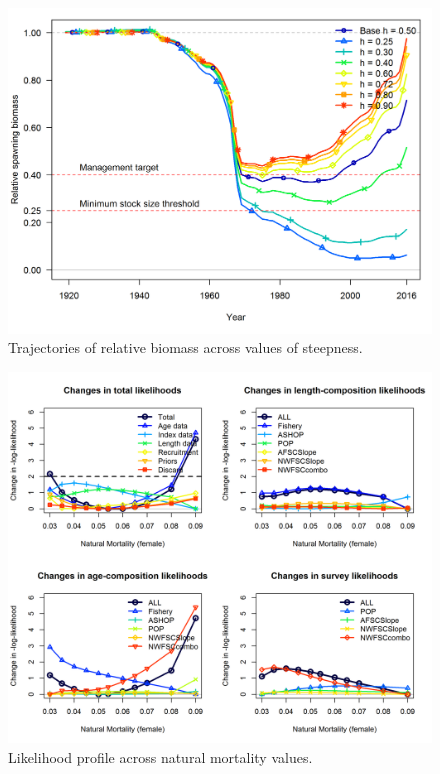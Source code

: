 \documentclass[12pt,]{article}
\begin{document}
\FloatBarrier

\begin{figure}
\centering
\includegraphics{Figures/h_trajectories.png}
\caption{Trajectories of relative biomass across values of steepness.
\label{fig:h_trajectory}}
\end{figure}

\FloatBarrier

\begin{figure}
\centering
\includegraphics{Figures/piner_panel_m.png}
\caption{Likelihood profile across natural mortality values.
\label{fig:m_like}}
\end{figure}
\end{document}
